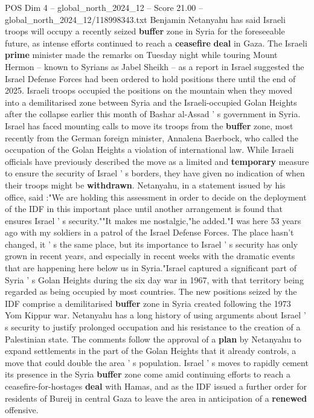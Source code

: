 \begin{textsample}{POS Dim 4 – global\_north\_2024\_12 – Score 21.00 – global\_north\_2024\_12/118998343.txt}  \label{ex:f4_pos_307}
Benjamin Netanyahu has said Israeli troops will occupy a recently seized \textbf{buffer} zone in Syria for the foreseeable future, as intense efforts continued to reach a \textbf{ceasefire} \textbf{deal} in Gaza.
The Israeli \textbf{prime} minister made the remarks on Tuesday night while touring Mount Hermon -- known to Syrians as Jabel Sheikh -- as a report in Israel suggested the Israel Defense Forces had been ordered to hold positions there until the end of 2025.
Israeli troops occupied the positions on the mountain when they moved into a demilitarised zone between Syria and the Israeli-occupied Golan Heights after the collapse earlier this month of Bashar al-Assad ' s government in Syria.
Israel has faced mounting calls to move its troops from the \textbf{buffer} zone, most recently from the German foreign minister, Annalena Baerbock, who called the occupation of the Golan Heights a violation of international law.
While Israeli officials have previously described the move as a limited and \textbf{temporary} measure to ensure the security of Israel ' s borders, they have given no indication of when their troops might be \textbf{withdrawn}.
Netanyahu, in a statement issued by his office, said :"We are holding this assessment in order to decide on the deployment of the IDF in this important place until another arrangement is found that ensures Israel ' s security.""It makes me nostalgic,"he added."I was here 53 years ago with my soldiers in a patrol of the Israel Defense Forces.
The place hasn't changed, it ' s the same place, but its importance to Israel ' s security has only grown in recent years, and especially in recent weeks with the dramatic events that are happening here below us in Syria."Israel captured a significant part of Syria ' s Golan Heights during the six day war in 1967, with that territory being regarded as being occupied by most countries.
The new positions seized by the IDF comprise a demilitarised \textbf{buffer} zone in Syria created following the 1973 Yom Kippur war.
Netanyahu has a long history of using arguments about Israel ' s security to justify prolonged occupation and his resistance to the creation of a Palestinian state.
The comments follow the approval of a \textbf{plan} by Netanyahu to expand settlements in the part of the Golan Heights that it already controls, a move that could double the area ' s population.
Israel ' s moves to rapidly cement its presence in the Syria \textbf{buffer} zone come amid continuing efforts to reach a ceasefire-for-hostages \textbf{deal} with Hamas, and as the IDF issued a further order for residents of Bureij in central Gaza to leave the area in anticipation of a \textbf{renewed} offensive.

\end{textsample}
